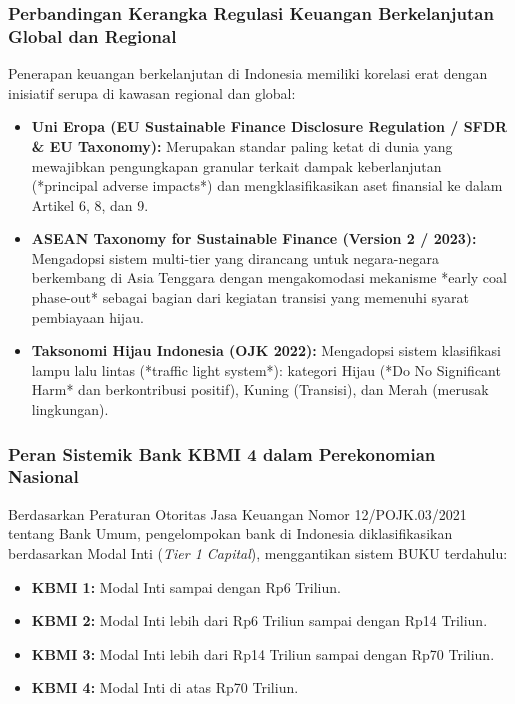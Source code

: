 \documentclass[12pt,a4paper]{article}
\numberwithin{equation}{section}
\begin{document}
\subsubsection*{Perbandingan Kerangka Regulasi Keuangan Berkelanjutan Global dan Regional}
\noindent
Penerapan keuangan berkelanjutan di Indonesia memiliki korelasi erat dengan inisiatif serupa di kawasan regional dan global:
\begin{itemize}
  \item \textbf{Uni Eropa (EU Sustainable Finance Disclosure Regulation / SFDR \& EU Taxonomy):} Merupakan standar paling ketat di dunia yang mewajibkan pengungkapan granular terkait dampak keberlanjutan (*principal adverse impacts*) dan mengklasifikasikan aset finansial ke dalam Artikel 6, 8, dan 9.
  \item \textbf{ASEAN Taxonomy for Sustainable Finance (Version 2 / 2023):} Mengadopsi sistem multi-tier yang dirancang untuk negara-negara berkembang di Asia Tenggara dengan mengakomodasi mekanisme *early coal phase-out* sebagai bagian dari kegiatan transisi yang memenuhi syarat pembiayaan hijau.
  \item \textbf{Taksonomi Hijau Indonesia (OJK 2022):} Mengadopsi sistem klasifikasi lampu lalu lintas (*traffic light system*): kategori Hijau (*Do No Significant Harm* dan berkontribusi positif), Kuning (Transisi), dan Merah (merusak lingkungan).
\end{itemize}

\subsubsection*{Peran Sistemik Bank KBMI 4 dalam Perekonomian Nasional}
\noindent
Berdasarkan Peraturan Otoritas Jasa Keuangan Nomor 12/POJK.03/2021 tentang Bank Umum, pengelompokan bank di Indonesia diklasifikasikan berdasarkan Modal Inti (\emph{Tier 1 Capital}), menggantikan sistem BUKU terdahulu:
\begin{itemize}
  \item \textbf{KBMI 1:} Modal Inti sampai dengan Rp6 Triliun.
  \item \textbf{KBMI 2:} Modal Inti lebih dari Rp6 Triliun sampai dengan Rp14 Triliun.
  \item \textbf{KBMI 3:} Modal Inti lebih dari Rp14 Triliun sampai dengan Rp70 Triliun.
  \item \textbf{KBMI 4:} Modal Inti di atas Rp70 Triliun.
\end{itemize}
\end{document}
